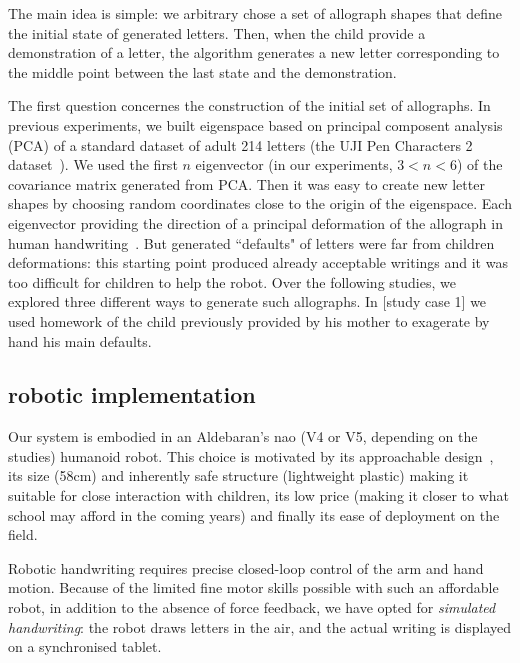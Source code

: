 \documentclass{sig-alternate}
\begin{document}
The main idea is simple: we arbitrary chose a set of allograph shapes
that define the initial state of generated letters.
Then, when the child provide a demonstration of a letter, the algorithm
generates
a new letter corresponding to the middle point between the last state and the
demonstration. 

The first question concernes the construction of the initial set of allographs.
In previous experiments, we built eigenspace based on principal composent
analysis (PCA) of a standard dataset of adult 214 letters (the UJI Pen Characters 2 dataset~\cite{Llorens2008}).
We used the first $n$ eigenvector (in
our experiments, $3 < n < 6$) of the covariance matrix
generated from PCA. Then it was easy to create new letter shapes by choosing
random coordinates close to the origin of the eigenspace. Each eigenvector
providing the direction of a principal deformation of the allograph in human
handwriting~\cite{Hood}. But generated ``defaults" of letters were far from
children deformations: this starting point produced already acceptable writings
and it was too difficult for children to help the robot.
Over the following studies, we explored three different ways to generate such
allographs. In [study case 1] we used homework of the child previously provided
by his mother to exagerate by hand his main defaults. 
\subsection{robotic implementation}

Our system is embodied in an Aldebaran's {\sc nao} (V4 or V5, depending on the
studies) humanoid robot. This choice is motivated by its approachable
design~\cite{Gouaillier2008}, its size (58cm) and inherently safe structure
(lightweight plastic) making it suitable for close interaction with children,
its low price (making it closer to what school may afford in the coming years)
and finally its ease of deployment on the field.

Robotic handwriting requires precise closed-loop control of the arm and hand
motion. Because of the limited fine motor skills possible with such an
affordable robot, in addition to the absence of force feedback, we have opted
for \emph{simulated handwriting}: the robot draws letters in the air, and the
actual writing is displayed on a synchronised tablet.
\end{document}

